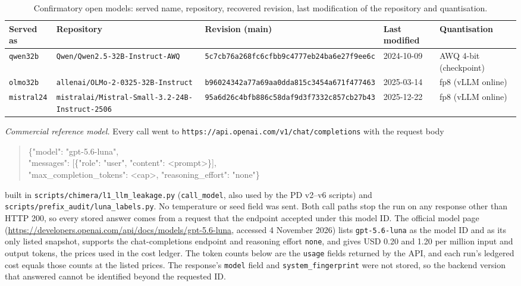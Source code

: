 \documentclass[11pt]{article}
\begin{document}
\begin{table}[!ht]\centering\scriptsize
\caption{Confirmatory open models: served name, repository, recovered revision, last modification of the repository and quantisation.}\label{tab:s-vllm}
\begin{tabular}{lp{5.0cm}p{4.6cm}lp{2.0cm}}
\toprule Served as & Repository & Revision (main) & Last modified & Quantisation \\ \midrule
\texttt{qwen32b} & \nolinkurl{Qwen/Qwen2.5-32B-Instruct-AWQ} & \texttt{5c7cb76a268fc6cfbb9c}\newline\texttt{4777eb24ba6e27f9ee6c} & 2024-10-09 & AWQ 4-bit (checkpoint) \\
\texttt{olmo32b} & \nolinkurl{allenai/OLMo-2-0325-32B-Instruct} & \texttt{b96024342a77a69aa0dd}\newline\texttt{a815c3454a671f477463} & 2025-03-14 & fp8 (vLLM online) \\
\texttt{mistral24} & \nolinkurl{mistralai/Mistral-Small-3.2-24B-Instruct-2506} & \texttt{95a6d26c4bfb886c58da}\newline\texttt{f9d3f7332c857cb27b43} & 2025-12-22 & fp8 (vLLM online) \\
\bottomrule\end{tabular}\end{table}
\emph{Commercial reference model.} Every call went to \nolinkurl{https://api.openai.com/v1/chat/completions} with the request body
\begin{quote}\scriptsize\ttfamily\raggedright \{"model": "gpt-5.6-luna",\\ \mbox{}\quad"messages": [\{"role": "user", "content": <prompt>\}],\\ \mbox{}\quad"max\_completion\_tokens": <cap>, "reasoning\_effort": "none"\}
\end{quote}
\noindent built in \nolinkurl{scripts/chimera/l1_llm_leakage.py} (\texttt{call\_model}, also used by the PD v2--v6 scripts) and \nolinkurl{scripts/prefix_audit/luna_labels.py}. No temperature or seed field was sent. Both call paths stop the run on any response other than HTTP 200, so every stored answer comes from a request that the endpoint accepted under this model ID. The official model page (\url{https://developers.openai.com/api/docs/models/gpt-5.6-luna}, accessed 4 November 2026) lists \texttt{gpt-5.6-luna} as the model ID and as its only listed snapshot, supports the chat-completions endpoint and reasoning effort \texttt{none}, and gives USD 0.20 and 1.20 per million input and output tokens, the prices used in the cost ledger. The token counts below are the \texttt{usage} fields returned by the API, and each run's ledgered cost equals those counts at the listed prices. The response's \texttt{model} field and \texttt{system\_fingerprint} were not stored, so the backend version that answered cannot be identified beyond the requested ID.
\end{document}

